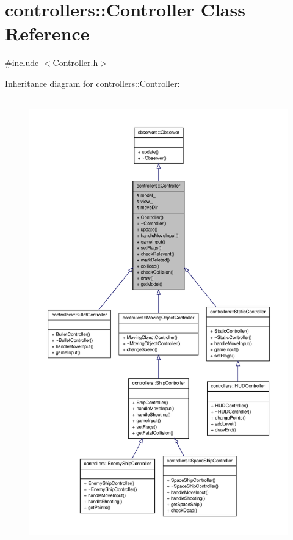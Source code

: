 \hypertarget{classcontrollers_1_1Controller}{\section{controllers\-:\-:\-Controller \-Class \-Reference}
\label{d4/d85/classcontrollers_1_1Controller}
}


{\ttfamily \#include $<$\-Controller.\-h$>$}



\-Inheritance diagram for controllers\-:\-:\-Controller\-:\nopagebreak
\begin{figure}[H]
\begin{center}
\leavevmode
\includegraphics[height=550pt]{d0/dba/classcontrollers_1_1Controller__inherit__graph}
\end{center}
\end{figure}



